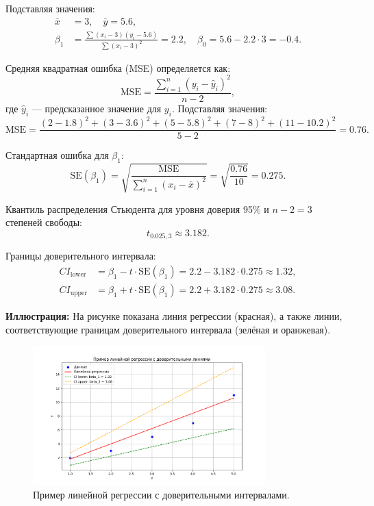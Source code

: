 \begin{itemize}
Подставляя значения:
\begin{align*}
\bar{x} &= 3, \quad \bar{y} = 5.6, \\
\beta_1 &= \frac{\sum (x_i - 3)(y_i - 5.6)}{\sum (x_i - 3)^2} = 2.2, \quad \beta_0 = 5.6 - 2.2 \cdot 3 = -0.4.
\end{align*}

Средняя квадратная ошибка (MSE) определяется как:
\[
\text{MSE} = \frac{\sum_{i=1}^n (y_i - \hat{y}_i)^2}{n - 2},
\]
где \(\hat{y}_i\) — предсказанное значение для \(y_i\). Подставляя значения:
\[
\text{MSE} = \frac{(2 - 1.8)^2 + (3 - 3.6)^2 + (5 - 5.8)^2 + (7 - 8)^2 + (11 - 10.2)^2}{5 - 2} = 0.76.
\]

Стандартная ошибка для \(\beta_1\):
\[
\text{SE}(\beta_1) = \sqrt{\frac{\text{MSE}}{\sum_{i=1}^n (x_i - \bar{x})^2}} = \sqrt{\frac{0.76}{10}} = 0.275.
\]

Квантиль распределения Стьюдента для уровня доверия 95\% и \(n-2=3\) степеней свободы:
\[
t_{0.025, 3} \approx 3.182.
\]

Границы доверительного интервала:
\begin{align*}
CI_{\text{lower}} &= \beta_1 - t \cdot \text{SE}(\beta_1) = 2.2 - 3.182 \cdot 0.275 \approx 1.32, \\
CI_{\text{upper}} &= \beta_1 + t \cdot \text{SE}(\beta_1) = 2.2 + 3.182 \cdot 0.275 \approx 3.08.
\end{align*}

\textbf{Иллюстрация:}
На рисунке показана линия регрессии (красная), а также линии, соответствующие границам доверительного интервала (зелёная и оранжевая).

\begin{figure}[h!]
    \centering
    \includegraphics[width=0.8\textwidth]{chapters/linear/pics/beta_range.png}
    \caption{Пример линейной регрессии с доверительными интервалами.}
\end{figure}


\end{itemize}
